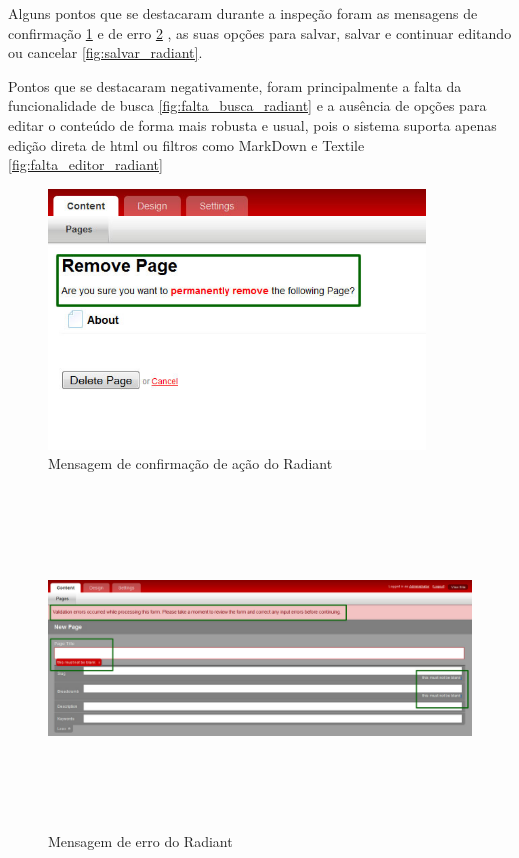 Alguns pontos que se destacaram durante a inspeção foram as mensagens de confirmação \ref{fig:confirmacao_radiant}  e de erro \ref{fig:erro_radiant} , as suas opções para salvar, salvar e continuar editando ou cancelar \ref{fig:salvar_radiant}.

Pontos que se destacaram negativamente, foram principalmente a falta da funcionalidade de busca \ref{fig:falta_busca_radiant} e a ausência de opções para editar o conteúdo de forma mais robusta e usual, pois o sistema suporta apenas edição direta de html ou filtros como MarkDown e Textile  \ref{fig:falta_editor_radiant} 

\begin{figure}[here]
\includegraphics[width=100mm]{images/radiant_ponto_mensagem.jpg}
\caption{Mensagem de confirmação de ação do Radiant }
\label{fig:confirmacao_radiant}
\end{figure}

\begin{figure}[here]
\includegraphics[width=170mm,height=90mm]{images/radiant_ponto_msg_erro.jpg}
\caption{Mensagem de erro do Radiant }
\label{fig:erro_radiant}
\end{figure}

